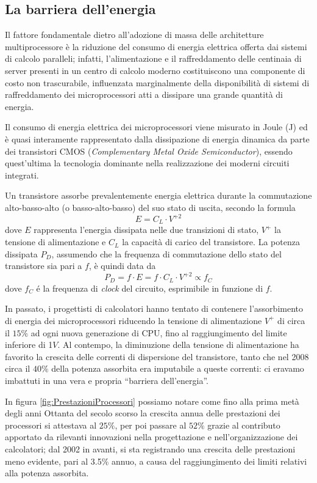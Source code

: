 \subsection{La barriera dell'energia}
\nocite{Spirito2021}
Il fattore fondamentale dietro all'adozione di massa delle architetture multiprocessore \`e la riduzione del consumo di energia elettrica offerta dai sistemi di calcolo paralleli; infatti, l'alimentazione e il raffreddamento delle centinaia di server presenti in un centro di calcolo moderno costituiscono una componente di costo non trascurabile, influenzata marginalmente della disponibilit\`a di sistemi di raffreddamento dei microprocessori atti a dissipare una grande quantit\`a di energia.

Il consumo di energia elettrica dei microprocessori viene misurato in Joule (\si{\joule}) ed \`e quasi interamente rappresentato dalla dissipazione di energia dinamica da parte dei transistori CMOS (\textit{Complementary Metal Oxide Semiconductor}), essendo quest'ultima la tecnologia dominante nella realizzazione dei moderni circuiti integrati.

Un transistore assorbe prevalentemente energia elettrica durante la commutazione alto-basso-alto (o basso-alto-basso) del suo stato di uscita, secondo la formula
$$
    E = C_{L} \cdot V^{+2}
$$
dove $E$ rappresenta l'energia dissipata nelle due transizioni di stato, $V^{+}$ la tensione di alimentazione e $C_{L}$ la capacit\`a di carico del transistore.\newline
La potenza dissipata $P_{D}$, assumendo che la frequenza di commutazione dello stato del transistore sia pari a $f$, \`e quindi data da
$$
    P_{D} = f \cdot E = f \cdot C_{L} \cdot V^{+2} \propto f_{C}
$$
dove $f_{C}$ \'e la frequenza di \textit{clock} del circuito, esprimibile in funzione di $f$.

In passato, i progettisti di calcolatori hanno tentato di contenere l'assorbimento di energia dei microprocessori riducendo la tensione di alimentazione $V^{+}$ di circa il $15\%$ ad ogni nuova generazione di CPU, fino al raggiungimento del limite inferiore di 1$\si{V}$.\newline
Al contempo, la diminuzione della tensione di alimentazione ha favorito la crescita delle correnti di dispersione del transistore, tanto che nel 2008 circa il $40\%$ della potenza assorbita era imputabile a queste correnti: ci eravamo imbattuti in una vera e propria \enquote{barriera dell'energia}.

In figura \ref{fig:PrestazioniProcessori} possiamo notare come fino alla prima met\`a degli anni Ottanta del secolo scorso la crescita annua delle prestazioni dei processori si attestava al $25\%$, per poi passare al $52\%$ grazie al contributo apportato da rilevanti innovazioni nella progettazione e nell'organizzazione dei calcolatori; dal 2002 in avanti, si sta registrando una crescita delle prestazioni meno evidente, pari al \num{3.5}\% annuo, a causa del raggiungimento dei limiti relativi alla potenza assorbita.

